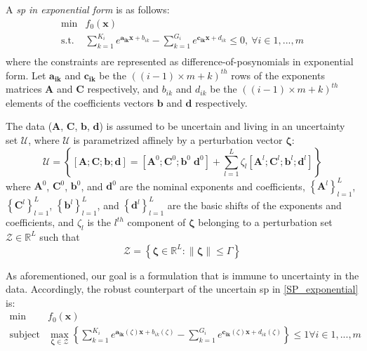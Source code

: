 A \emph{\gls{sp} in exponential form} is as follows:
\begin{equation}
    \begin{split}
	\min & f_0\left(\mathbf{x}\right) \\
	\text{s.t.} & \textstyle{\sum}_{k=1}^{K_i}e^{\mathbf{a_{ik}}\mathbf{x} + b_{ik}} - \textstyle{\sum}_{k=1}^{G_i}e^{\mathbf{c_{ik}}\mathbf{x} + d_{ik}} \leq 0,~\forall i \in 1,...,m\\
\end{split}
\label{SP_exponential}
\end{equation}
where the constraints are represented as difference-of-posynomials in exponential form.
Let $\mathbf{a_{ik}}$ and $\mathbf{c_{ik}}$ be the $((i-1)\times m + k)^{th}$ rows of the exponents matrices
$\mathbf{A}$ and $\mathbf{C}$ respectively, and $b_{ik}$ and $d_{ik}$ be the $((i-1)\times m + k)^{th}$ elements
of the coefficients vectors $\mathbf{b}$ and $\mathbf{d}$ respectively.

The data ($\mathbf{A}$, $\mathbf{C}$, $\mathbf{b}$, $\mathbf{d}$) is assumed to be uncertain and
living in an uncertainty set $\mathcal{U}$, where $\mathcal{U}$ is parametrized
affinely by a perturbation vector $\mathbf{\zeta}$:
\begin{equation}
\mathcal{U} = \left\{\left[\mathbf{A};\mathbf{C};\mathbf{b};\mathbf{d}\right] = \left[\mathbf{A}^0;\mathbf{C}^0;\mathbf{b}^0\;\mathbf{d}^0 \right] +
\textstyle{\sum_{l=1}^{L}\zeta_l\left[\mathbf{A}^l;\mathbf{C}^l;\mathbf{b}^l; \mathbf{d}^l\right]}\right\}
\label{Data}
\end{equation}
where $\mathbf{A}^0$, $\mathbf{C}^0$, $\mathbf{b}^0$, and $\mathbf{d}^0$ are the nominal exponents and coefficients,
$\left\{\mathbf{A}^l\right\}_{l=1}^{L}$, $\left\{\mathbf{C}^l\right\}_{l=1}^{L}$, $\left\{\mathbf{b}^l\right\}_{l=1}^{L}$, and
$\left\{\mathbf{d}^l\right\}_{l=1}^{L}$ are the basic shifts of the exponents and coefficients,
and $\zeta_l$ is the $l^{th}$ component of $\mathbf{\zeta}$ belonging to a perturbation set $\mathcal{Z} \in \mathbb{R}^L$ such that
\begin{equation}
\mathcal{Z} = \left\{ \mathbf{\zeta} \in \mathbb{R}^L: \left\lVert \mathbf{\zeta} \right\rVert \leq \Gamma \right\}
\label{perturbation_set}
\end{equation}

As aforementioned, our goal is a formulation that is immune to
uncertainty in the data. Accordingly, the robust counterpart
of the uncertain \gls{sp} in \eqref{SP_exponential} is:
\begin{equation}
    \label{SP_counterparts_finite}
    \begin{split}
        \min & f_0\left(\mathbf{x}\right)\\
        \text{subject to} &\max_{\mathbf{\zeta} \in \mathcal{Z}} \left\{\textstyle{\sum}_{k=1}^{K_i}e^{\mathbf{a_{ik}}\left(\zeta\right)\mathbf{x} + b_{ik}\left(\zeta\right)} - \textstyle{\sum}_{k=1}^{G_i}e^{\mathbf{c_{ik}}\left(\zeta\right)\mathbf{x} + d_{ik}\left(\zeta\right)}\right\} \leq 1 \forall i \in 1,...,m\\
    \end{split}
\end{equation}

